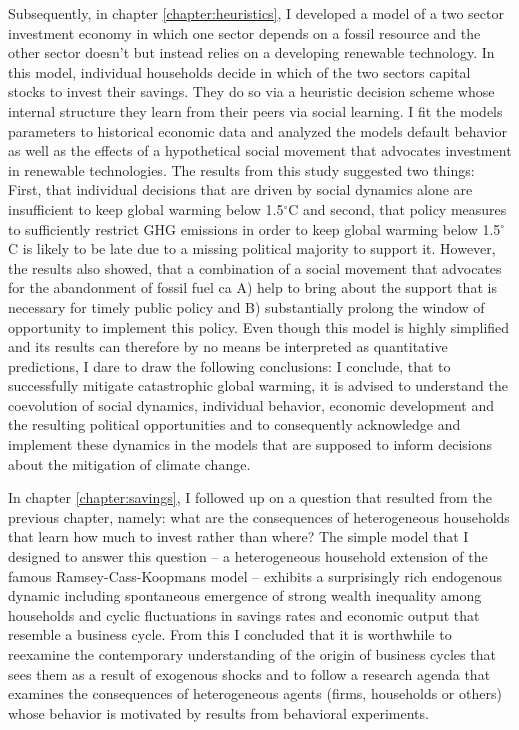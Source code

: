 Subsequently, in chapter \ref{chapter:heuristics}, I developed a model of a two sector investment economy in which one sector depends on a fossil resource and the other sector doesn't but instead relies on a developing renewable technology. In this model, individual households decide in which of the two sectors capital stocks to invest their savings. They do so via a heuristic decision scheme whose internal structure they learn from their peers via social learning. I fit the models parameters to historical economic data and analyzed the models default behavior as well as the effects of a hypothetical social movement that advocates investment in renewable technologies.
The results from this study suggested two things: First, that individual decisions that are driven by social dynamics alone are insufficient to keep global warming below 1.5$^\circ$C and second, that policy measures to sufficiently restrict GHG emissions in order to keep global warming below 1.5$^\circ$C is likely to be late due to a missing political majority to support it. However, the results also showed, that a combination of a social movement that advocates for the abandonment of fossil fuel ca A) help to bring about the support that is necessary for timely public policy and B) substantially prolong the window of opportunity to implement this policy. Even though this model is highly simplified and its results can therefore by no means be interpreted as quantitative predictions, I dare to draw the following conclusions:
I conclude, that to successfully mitigate catastrophic global warming, it is advised to understand the coevolution of social dynamics, individual behavior, economic development and the resulting political opportunities and to consequently acknowledge and implement these dynamics in the models that are supposed to inform decisions about the mitigation of climate change.

In chapter \ref{chapter:savings}, I followed up on a question that resulted from the previous chapter, namely: what are the consequences of heterogeneous households that learn how much to invest rather than where? The simple model that I designed to answer this question -- a heterogeneous household extension of the famous Ramsey-Cass-Koopmans model -- exhibits a surprisingly rich endogenous dynamic including spontaneous emergence of strong wealth inequality among households and cyclic fluctuations in savings rates and economic output that resemble a business cycle.
From this I concluded that it is worthwhile to reexamine the contemporary understanding of the origin of business cycles that sees them as a result of exogenous shocks and to follow a research agenda that examines the consequences of heterogeneous agents (firms, households or others) whose behavior is motivated by results from behavioral experiments.

